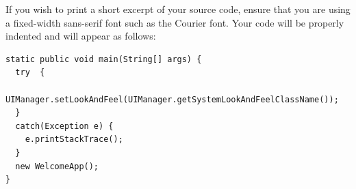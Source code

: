 \documentclass[]{final_report}
\begin{document}
If you wish to print a short excerpt of your source code,  ensure that you are using a fixed-width sans-serif font such as the Courier font. Your code will be properly indented and will appear as follows:

\begin{verbatim}
static public void main(String[] args) {
  try  {
    UIManager.setLookAndFeel(UIManager.getSystemLookAndFeelClassName());
  }
  catch(Exception e) {
    e.printStackTrace();
  }
  new WelcomeApp();
} 
\end{verbatim}


\newpage

 

\label{endpage}
\end{document}
